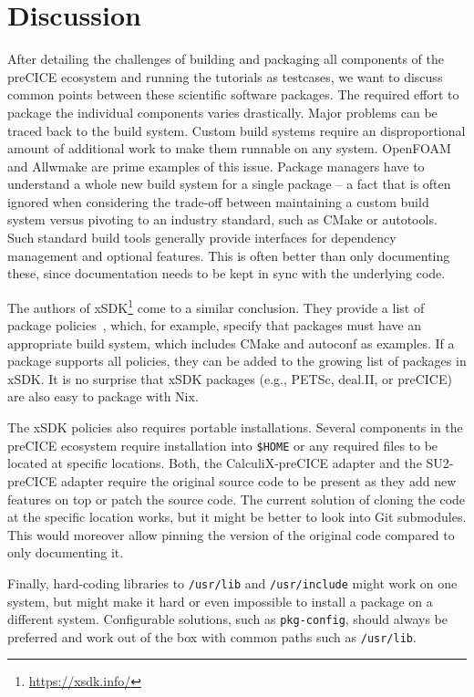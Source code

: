 \documentclass{eceasst}
\begin{document}
\section{Discussion}

After detailing the challenges of building and packaging all components of the preCICE ecosystem and running the tutorials as testcases, we want to discuss common points between these scientific software packages.
The required effort to package the individual components varies drastically. Major problems can be traced back to the build system.
Custom build systems require an disproportional amount of additional work to make them runnable on any system.
OpenFOAM and Allwmake are prime examples of this issue. Package managers have to understand a whole new build system for a single package -- a fact that is often ignored when considering the trade-off between maintaining a custom build system versus pivoting to an industry standard, such as CMake or autotools.
Such standard build tools generally provide interfaces for dependency management and optional features. This is often better than only documenting these, since documentation needs to be kept in sync with the underlying code.

The authors of xSDK\footnote{\url{https://xsdk.info/}} come to a similar conclusion.
They provide a list of package policies~\cite{xSDK2023}, which, for example, specify that packages must have an appropriate build system, which includes CMake and autoconf as examples.
If a package supports all policies, they can be added to the growing list of packages in xSDK.
It is no surprise that xSDK packages (e.g., PETSc, deal.II, or preCICE) are also easy to package with Nix.

The xSDK policies also requires portable installations. Several components in the preCICE ecosystem require installation into \texttt{\$HOME} or any required files to be located at specific locations. Both, the CalculiX-preCICE adapter and the SU2-preCICE adapter require the original source code to be present as they add new features on top or patch the source code.
The current solution of cloning the code at the specific location works, but it might be better to look into Git submodules. This would moreover allow pinning the version of the original code compared to only documenting it.

Finally, hard-coding libraries to \texttt{/usr/lib} and \texttt{/usr/include} might work on one system, but might make it hard or even impossible to install a package on a different system.
Configurable solutions, such as \texttt{pkg-config}, should always be preferred and work out of the box with common paths such as \texttt{/usr/lib}.
\end{document}
